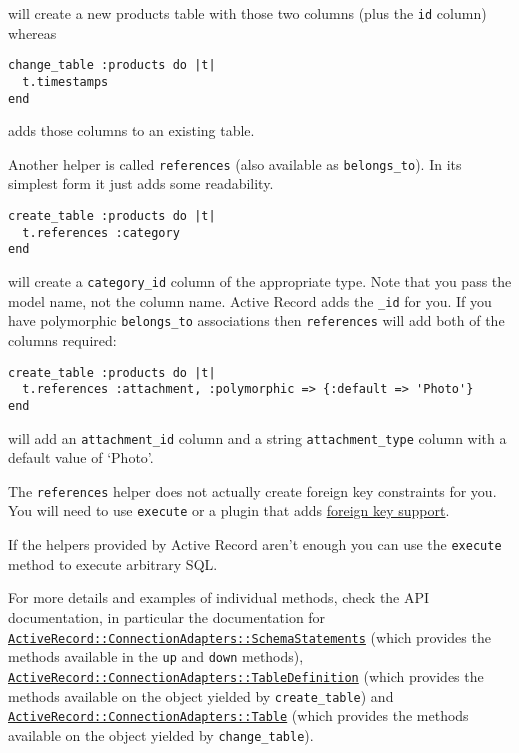 \documentclass[10pt]{book}
\begin{document}
will create a new products table with those two columns (plus the \texttt{id} column) whereas
\begin{verbatim}
change_table :products do |t|
  t.timestamps
end
\end{verbatim}

adds those columns to an existing table.

Another helper is called \texttt{references} (also available as \texttt{belongs\_to}). In its simplest form it just adds some readability.
\begin{verbatim}
create_table :products do |t|
  t.references :category
end
\end{verbatim}

will create a \texttt{category\_id} column of the appropriate type. Note that you pass the model name, not the column name. Active Record adds the \texttt{\_id} for you. If you have polymorphic \texttt{belongs\_to} associations then \texttt{references} will add both of the columns required:
\begin{verbatim}
create_table :products do |t|
  t.references :attachment, :polymorphic => {:default => 'Photo'}
end
\end{verbatim}

will add an \texttt{attachment\_id} column and a string \texttt{attachment\_type} column with a default value of ‘Photo’.

The \texttt{references} helper does not actually create foreign key constraints for you. You will need to use \texttt{execute} or a plugin that adds \hyperlink{active-record-and-referential-integrity}{foreign key support}.

If the helpers provided by Active Record aren’t enough you can use the \texttt{execute} method to execute arbitrary SQL.

For more details and examples of individual methods, check the API documentation, in particular the documentation for \href{http://api.rubyonrails.org/classes/ActiveRecord/ConnectionAdapters/SchemaStatements.html}{\texttt{ActiveRecord::ConnectionAdapters::SchemaStatements}} (which provides the methods available in the \texttt{up} and \texttt{down} methods), \href{http://api.rubyonrails.org/classes/ActiveRecord/ConnectionAdapters/TableDefinition.html}{\texttt{ActiveRecord::ConnectionAdapters::TableDefinition}} (which provides the methods available on the object yielded by \texttt{create\_table}) and \href{http://api.rubyonrails.org/classes/ActiveRecord/ConnectionAdapters/Table.html}{\texttt{ActiveRecord::ConnectionAdapters::Table}} (which provides the methods available on the object yielded by \texttt{change\_table}).
\end{document}
